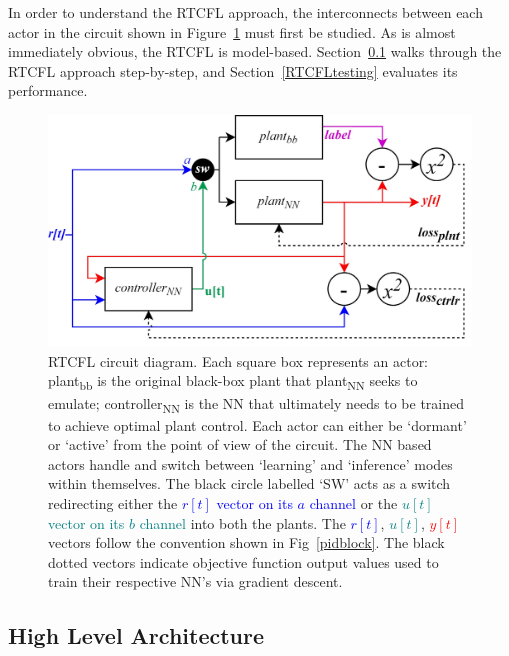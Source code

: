\documentclass[10pt,twocolumn,letterpaper]{article}
\begin{document}
        In order to understand the RTCFL approach, the interconnects between each actor in the circuit shown in
        Figure~\ref{rtcflcircuit} must first be studied. As is almost immediately obvious, the RTCFL is model-based.
        Section~\ref{RTCFLarch} walks through the RTCFL approach step-by-step, and Section~\ref{RTCFLtesting} evaluates
        its performance.

        \begin{figure}[h]
            \includegraphics[width=\linewidth]{./Figures/rtcfl-circuit.jpg}
            \centering
            \caption{RTCFL circuit diagram. Each square box represents an actor: plant\textsubscript{bb} is the original
                black-box plant that plant\textsubscript{NN} seeks to emulate; controller\textsubscript{NN} is the NN
                that ultimately needs to be trained to achieve optimal plant control. Each actor can either be `dormant'
                or `active' from the point of view of the circuit. The NN based actors handle and switch between
                `learning' and `inference' modes within themselves. The black circle labelled `SW' acts as a switch
                redirecting either the \textcolor{blue}{$r[t]$ vector on its $a$ channel} or the \textcolor{teal}{$u[t]$
                vector on its $b$ channel} into both the plants. The \textcolor{blue}{$r[t]$}, \textcolor{teal}{$u[t]$},
                \textcolor{red}{$y[t]$} vectors follow the convention shown in Fig~\ref{pidblock}. The black dotted
                vectors indicate objective function output values used to train their respective NN's via gradient
                descent.}
            \label{rtcflcircuit}
        \end{figure}

        \subsection{High Level Architecture} \label{RTCFLarch}
\end{document}
